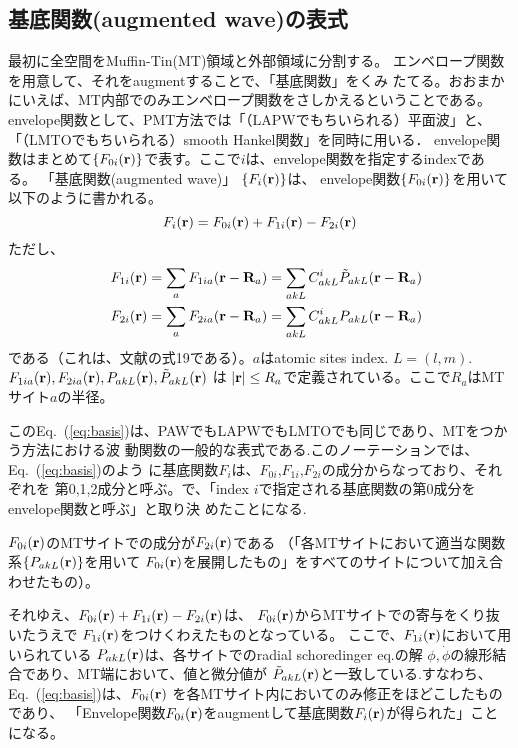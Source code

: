 \documentclass[a4paper,10pt,aip,onecolumn,amsmath,amssymb,floatfix,rmp]{revtex4-1}
\newcommand{\bfr}{{\bf r}}
\newcommand{\bfR}{{\bf R}}
\def\phidot{\dot{\phi}}
\newcommand{\req}[1]{\mbox{Eq.~\!(\ref{#1})}}
\begin{document}
\subsection{基底関数(augmented wave)の表式} 
最初に全空間をMuffin-Tin(MT)領域と外部領域に分割する。
エンベロープ関数を用意して、それをaugmentすることで、「基底関数」をくみ
たてる。おおまかにいえば、MT内部でのみエンベロープ関数をさしかえるということである。
envelope関数として、PMT方法では「（LAPWでもちいられる）平面波」と、
「（LMTOでもちいられる）smooth Hankel関数」を同時に用いる．
envelope関数はまとめて$\{{F}_{0i}(\bfr)\}$で表す。ここで$i$は、envelope関数を指定するindexである。
「基底関数(augmented wave)」 $\{{F}_i(\bfr)\}$は、
envelope関数$\{F_{0i}(\bfr)\}$を用いて以下のように書かれる。　　
\begin{equation}
F_i(\bfr) = F_{0i}(\bfr) + F_{1i}(\bfr)-F_{2i}(\bfr) \label{eq:basis} \\
\end{equation}
ただし、
\begin{eqnarray}
&&F_{1i}(\bfr)=\sum_a F_{1ia}(\bfr-\bfR_a)= \sum_{akL} C^{i}_{akL} \tilde{P}_{akL}(\bfr-\bfR_a) \\ 
&&F_{2i}(\bfr)=\sum_a F_{2ia}(\bfr-\bfR_a)= \sum_{akL} C^{i}_{akL} {P}_{akL}(\bfr-\bfR_a)  
\end{eqnarray}
である（これは、文献\cite{lmfchap}の式19である）。$a$はatomic sites
index. $L=(l,m)$.$F_{1ia}(\bfr),F_{2ia}(\bfr),P_{akL} (\bfr),\tilde{P}_{akL} (\bfr)$ は 
$|\bfr| \le R_a$で定義されている。ここで$R_a$はMTサイト$a$の半径。
 
この\req{eq:basis}は、PAWでもLAPWでもLMTOでも同じであり、MTをつかう方法における波
動関数の一般的な表式である.このノーテーションでは、\req{eq:basis}のよう
に基底関数$F_i$は、$F_{0i}$,$F_{1i}$,$F_{2i}$の成分からなっており、それぞれを
第0,1,2成分と呼ぶ。で、「index $i$で指定される基底関数の第0成分をenvelope関数と呼ぶ」と取り決
めたことになる.

$F_{0i}(\bfr)$のMTサイトでの成分が$F_{2i}(\bfr)$である
（「各MTサイトにおいて適当な関数系$\{{P}_{akL}(\bfr)\}$を用いて
$F_{0i}(\bfr)$を展開したもの」をすべてのサイトについて加え合わせたもの）。

それゆえ、$F_{0i}(\bfr)+F_{1i}(\bfr)-F_{2i}(\bfr)$は、
$F_{0i}(\bfr)$からMTサイトでの寄与をくり抜いたうえで
$F_{1i}(\bfr)$をつけくわえたものとなっている。
ここで、$F_{1i}(\bfr)$において用いられている
${P}_{akL}(\bfr)$は、各サイトでのradial schoredinger eq.の解
$\phi,\phidot$の線形結合であり、MT端において、値と微分値が
$\tilde{P}_{akL}(\bfr)$と一致している.すなわち、
\req{eq:basis}は、$F_{0i}(\bfr)$
を各MTサイト内においてのみ修正をほどこしたものであり、
「Envelope関数$F_{0i}(\bfr)$をaugmentして基底関数$F_i(\bfr)$が得られた」ことになる。
\end{document}
